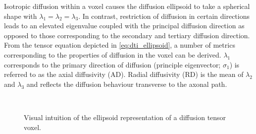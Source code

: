 Isotropic diffusion within a voxel causes the diffusion ellipsoid to take a spherical shape with $\lambda_1=\lambda_2=\lambda_3$. In contrast, restriction of diffusion in certain directions leads to an elevated eigenvalue coupled with the principal diffusion direction as opposed to those corresponding to the secondary and tertiary diffusion direction. From the tensor equation depicted in \equationname \ref{eq:dti_ellipsoid}, a number of metrics corresponding to the properties of diffusion in the voxel can be derived. $\lambda_1$ corresponds to the primary direction of diffusion (principle eigenvector; $\sigma_1$) is referred to as the axial diffusivity (AD). Radial diffusivity (RD) is the mean of $\lambda_2$ and $\lambda_3$ and reflects the diffusion behaviour transverse to the axonal path. 
\begin{figure}
	\centering
	\\
	\caption{Visual intuition of the ellipsoid representation of a diffusion tensor voxel.}
	\label{fig:dti_ellipsoid}
\end{figure}

